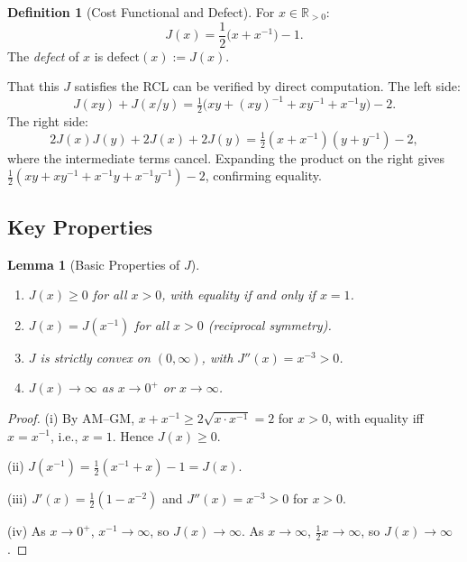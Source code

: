 \documentclass[12pt,a4paper]{article}
\newtheorem{lemma}[theorem]{Lemma}
\theoremstyle{definition}
\newtheorem{definition}[theorem]{Definition}
\theoremstyle{remark}
\begin{document}
\begin{definition}[Cost Functional and Defect]
\label{def:Jx}
For $x \in \mathbb{R}_{>0}$:
\begin{equation}
\label{eq:J}
  J(x) = \frac{1}{2}\bigl(x + x^{-1}\bigr) - 1.
\end{equation}
The \emph{defect} of $x$ is $\mathrm{defect}(x) := J(x)$.
\end{definition}

\noindent
That this $J$ satisfies the RCL can be verified by direct computation.
The left side:
\begin{equation}
  J(xy) + J(x/y) = \tfrac{1}{2}\bigl(xy + (xy)^{-1} + xy^{-1}
  + x^{-1}y\bigr) - 2.
\end{equation}
The right side:
\begin{equation}
  2J(x)J(y) + 2J(x) + 2J(y)
  = \tfrac{1}{2}(x + x^{-1})(y + y^{-1}) - 2,
\end{equation}
where the intermediate terms cancel.  Expanding the product on the right
gives $\tfrac{1}{2}(xy + xy^{-1} + x^{-1}y + x^{-1}y^{-1}) - 2$,
confirming equality.

\subsection{Key Properties}

\begin{lemma}[Basic Properties of $J$]
\label{lem:J-props}
\begin{enumerate}[label=(\roman*)]
  \item $J(x) \geq 0$ for all $x > 0$, with equality if and only if
  $x = 1$.
  \item $J(x) = J(x^{-1})$ for all $x > 0$ (reciprocal symmetry).
  \item $J$ is strictly convex on $(0, \infty)$, with
  $J''(x) = x^{-3} > 0$.
  \item $J(x) \to \infty$ as $x \to 0^+$ or $x \to \infty$.
\end{enumerate}
\end{lemma}

\begin{proof}
(i) By AM--GM, $x + x^{-1} \geq 2\sqrt{x \cdot x^{-1}} = 2$ for
$x > 0$, with equality iff $x = x^{-1}$, i.e., $x = 1$.  Hence
$J(x) \geq 0$.

(ii) $J(x^{-1}) = \tfrac{1}{2}(x^{-1} + x) - 1 = J(x)$.

(iii) $J'(x) = \tfrac{1}{2}(1 - x^{-2})$ and
$J''(x) = x^{-3} > 0$ for $x > 0$.

(iv) As $x \to 0^+$, $x^{-1} \to \infty$, so $J(x) \to \infty$.
As $x \to \infty$, $\tfrac{1}{2}x \to \infty$, so $J(x) \to \infty$.
\end{proof}
\end{document}
